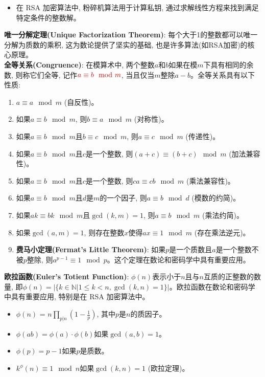 \documentclass[12pt, a4paper, UTF8]{ctexart}
\newcommand{\term}[1]{\textbf{\textcolor{blue!80!black}{#1}}}
\newcommand{\mhl}[1]{\textcolor{red!80!black}{#1}}
\begin{document}
\begin{sloppypar}
\begin{itemize}[nosep]
        \item 在 RSA 加密算法中, 粉碎机算法用于计算私钥, 通过求解线性方程来找到满足特定条件的整数解。
    \end{itemize}
    \term{唯一分解定理(Unique Factorization Theorem)}: 每个大于1的整数都可以唯一分解为质数的乘积, 这为数论提供了坚实的基础, 也是许多算法(如RSA加密)的核心原理。\\
    \term{全等关系(Congruence)}: 在模算术中, 两个整数$a$和$b$如果在模$m$下具有相同的余数, 则称它们全等, 记作$\mhl{a \equiv b \mod m}$, 当且仅当$m$整除$a - b$。全等关系具有以下性质:
    \begin{enumerate}[nosep]
        \item $a \equiv a \mod m$ (自反性)。
        \item 如果$a \equiv b \mod m$, 则$b \equiv a \mod m$ (对称性)。
        \item 如果$a \equiv b \mod m$且$b \equiv c \mod m$, 则$a \equiv c \mod m$ (传递性)。
        \item 如果$a \equiv b \mod m$且$c$是一个整数, 则$(a + c) \equiv (b + c) \mod m$ (加法兼容性)。
        \item 如果$a \equiv b \mod m$且$c$是一个整数, 则$ca \equiv cb \mod m$ (乘法兼容性)。
        \item 如果$a \equiv b \mod m$且$d$是$m$的一个因子, 则$a \equiv b \mod d$ (模数的约简)。
        \item 如果$ak \equiv bk \mod m$且$\gcd(k, m) = 1$, 则$a \equiv b \mod m$ (乘法约简)。
        \item 如果$\gcd(a, m) = 1$, 则存在整数$x$使得$ax \equiv 1 \mod m$ (存在乘法逆元)。
        \item \term{费马小定理(Fermat's Little Theorem)}: 如果$p$是一个质数且$a$是一个整数不被$p$整除, 则$a^{p-1} \equiv 1 \mod p$。这个定理在数论和密码学中具有重要应用。
    \end{enumerate}
    \term{欧拉函数(Euler's Totient Function)}: $\phi(n)$表示小于$n$且与$n$互质的正整数的数量, 即$\phi(n) = |\{ k \in \mathbb{N} | 1 \leq k < n, \gcd(k, n) = 1 \}|$。欧拉函数在数论和密码学中具有重要应用, 特别是在 RSA 加密算法中。
    \begin{itemize}[nosep]
        \item $\phi(n)$ = $n \prod_{p | n} (1 - \frac{1}{p})$, 其中$p$是$n$的质因子。
        \item $\phi(ab) = \phi(a) \cdot \phi(b)$如果$\gcd(a, b) = 1$。
        \item $\phi(p) = p - 1$如果$p$是质数。
        \item $k^\phi(n) \equiv 1 \mod n$如果$\gcd(k, n) = 1$ (欧拉定理)。

\end{itemize}
\end{sloppypar}
\end{document}
